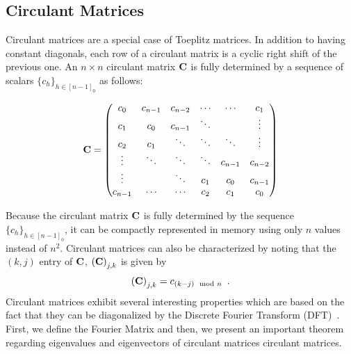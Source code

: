 \subsection{Circulant Matrices}
\label{subsection:ch2-circulant_matrices}

Circulant matrices are a special case of Toeplitz matrices.
In addition to having constant diagonals, each row of a circulant matrix is a cyclic right shift of the previous one.
An $n \times n$ circulant matrix $\mathbf{C}$ is fully determined by a sequence of scalars $\{c_h\}_{h \in [n-1]_0}$ as follows:

\begin{equation}
  \mathbf{C} =
  \begin{pmatrix}
    c_0 & c_{n-1} & c_{n-2} & \cdots & \cdots & c_{1} \\
    c_{1} & c_0 & c_{n-1} & \ddots & & \vdots \\
    c_{2} & c_{1} & \ddots & \ddots & \ddots & \vdots \\
    \vdots & \ddots & \ddots & \ddots & c_{n-1} & c_{n-2} \\
    \vdots & & \ddots & c_{1} & c_{0} & c_{n-1} \\
    c_{n-1} & \cdots & \cdots & c_{2} & c_{1} & c_0
  \end{pmatrix}
\end{equation}

Because the circulant matrix $\mathbf{C}$ is fully determined by the sequence $\{c_h\}_{h \in [n-1]_0}$, it can be compactly represented in memory using only $n$ values instead of $n^2$.
Circulant matrices can also be characterized by noting that the $(k,j)$ entry of $\mathbf{C}$, $\leftmat \Cmat \rightmat_{j,k}$ is given by
\begin{equation}
  \leftmat \Cmat \rightmat_{j,k} = c_{\left(k-j\right) \mod n} \enspace.
\end{equation}
Circulant matrices exhibit several interesting properties which are based on the fact that they can be diagonalized by the Discrete Fourier Transform (DFT)~\cite{davis1979circulant}.
First, we define the Fourier Matrix and then, we present an important theorem regarding eigenvalues and eigenvectors of circulant matrices circulant matrices.

